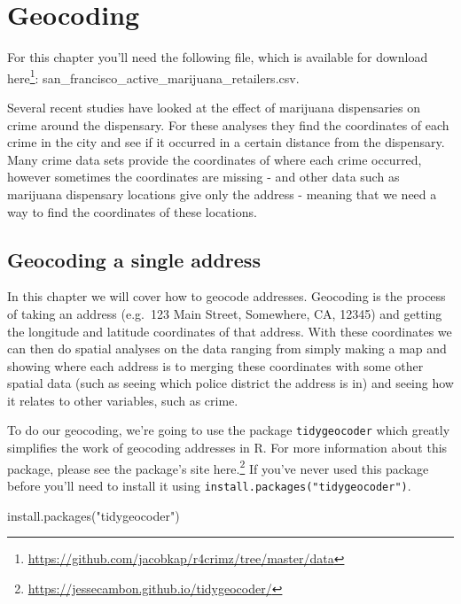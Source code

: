 \documentclass[
  a4paper,
]{krantz}
\makeatletter
\newenvironment{Shaded}{\begin{snugshade}}{\end{snugshade}}
\newcommand{\FunctionTok}[1]{\textcolor[rgb]{0.00,0.00,0.00}{#1}}
\newcommand{\NormalTok}[1]{#1}
\newcommand{\StringTok}[1]{\textcolor[rgb]{0.31,0.60,0.02}{#1}}
\renewcommand{\href}[2]{#2\footnote{\url{#1}}}
\newenvironment{kframe}{%
\medskip{}
\setlength{\fboxsep}{.8em}
 \def\at@end@of@kframe{}%
 \ifinner\ifhmode%
  \def\at@end@of@kframe{\end{minipage}}%
  \begin{minipage}{\columnwidth}%
 \fi\fi%
 \def\FrameCommand##1{\hskip\@totalleftmargin \hskip-\fboxsep
 \colorbox{shadecolor}{##1}\hskip-\fboxsep
     \hskip-\linewidth \hskip-\@totalleftmargin \hskip\columnwidth}%
 \MakeFramed {\advance\hsize-\width
   \@totalleftmargin\z@ \linewidth\hsize
   \@setminipage}}%
 {\par\unskip\endMakeFramed%
 \at@end@of@kframe}
\renewenvironment{Shaded}{\begin{kframe}}{\end{kframe}}
\makeatother
\begin{document}
\hypertarget{geocoding}{%
\chapter{Geocoding}\label{geocoding}}

For this chapter you'll need the following file, which is
available for download
\href{https://github.com/jacobkap/r4crimz/tree/master/data}{here}:
san\_francisco\_active\_marijuana\_retailers.csv.

Several recent studies have looked at the effect of
marijuana dispensaries on crime around the dispensary. For
these analyses they find the coordinates of each crime in
the city and see if it occurred in a certain distance from
the dispensary. Many crime data sets provide the coordinates
of where each crime occurred, however sometimes the
coordinates are missing - and other data such as marijuana
dispensary locations give only the address - meaning that we
need a way to find the coordinates of these locations.

\hypertarget{geocoding-a-single-address}{%
\section{Geocoding a single
address}\label{geocoding-a-single-address}}

In this chapter we will cover how to geocode addresses.
Geocoding is the process of taking an address (e.g.~123 Main
Street, Somewhere, CA, 12345) and getting the longitude and
latitude coordinates of that address. With these coordinates
we can then do spatial analyses on the data ranging from
simply making a map and showing where each address is to
merging these coordinates with some other spatial data (such
as seeing which police district the address is in) and
seeing how it relates to other variables, such as crime.

To do our geocoding, we're going to use the package
\texttt{tidygeocoder} which greatly simplifies the work of
geocoding addresses in R. For more information about this
package, please see the package's site
\href{https://jessecambon.github.io/tidygeocoder/}{here.} If
you've never used this package before you'll need to install
it using \texttt{install.packages("tidygeocoder")}.

\begin{Shaded}
\begin{Highlighting}[]
\FunctionTok{install.packages}\NormalTok{(}\StringTok{"tidygeocoder"}\NormalTok{)}
\end{Highlighting}
\end{Shaded}
\end{document}
